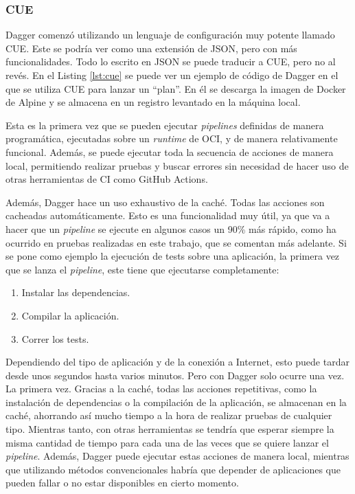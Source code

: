 \subsubsection*{CUE}
\label{subsec:cue}

Dagger comenzó utilizando un lenguaje de configuración muy potente llamado CUE\cite{cue}. Este se podría ver como una extensión de JSON, pero con más funcionalidades. Todo lo escrito en JSON se puede traducir a CUE, pero no al revés. En el Listing \ref{lst:cue} se puede ver un ejemplo de código de Dagger en el que se utiliza CUE para lanzar un ``plan''. En él se descarga la imagen de Docker de Alpine y se almacena en un registro levantado en la máquina local.

Esta es la primera vez que se pueden ejecutar \textit{pipelines} definidas de manera programática, ejecutadas sobre un \textit{runtime} de OCI, y de manera relativamente funcional. Además, se puede ejecutar toda la secuencia de acciones de manera local, permitiendo realizar pruebas y buscar errores sin necesidad de hacer uso de otras herramientas de CI como GitHub Actions\cite{github-actions}.

Además, Dagger hace un uso exhaustivo de la caché. Todas las acciones son cacheadas automáticamente. Esto es una funcionalidad muy útil, ya que va a hacer que un \textit{pipeline} se ejecute en algunos casos un 90\% más rápido, como ha ocurrido en pruebas realizadas en este trabajo, que se comentan más adelante. Si se pone como ejemplo la ejecución de tests sobre una aplicación, la primera vez que se lanza el \textit{pipeline}, este tiene que ejecutarse completamente:

\begin{enumerate}
  \item Instalar las dependencias.
  \item Compilar la aplicación.
  \item Correr los tests.
\end{enumerate}

Dependiendo del tipo de aplicación y de la conexión a Internet, esto puede tardar desde unos segundos hasta varios minutos. Pero con Dagger solo ocurre una vez. La primera vez. Gracias a la caché, todas las acciones repetitivas, como la instalación de dependencias o la compilación de la aplicación, se almacenan en la caché, ahorrando así mucho tiempo a la hora de realizar pruebas de cualquier tipo. Mientras tanto, con otras herramientas se tendría que esperar siempre la misma cantidad de tiempo para cada una de las veces que se quiere lanzar el \textit{pipeline}. Además, Dagger puede ejecutar estas acciones de manera local, mientras que utilizando métodos convencionales habría que depender de aplicaciones que pueden fallar o no estar disponibles en cierto momento.

